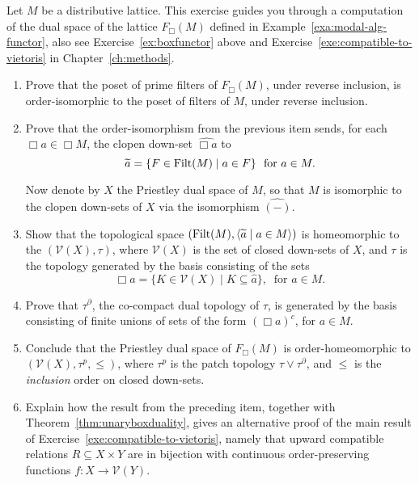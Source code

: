   
  \begin{exercise}\label{ex:upperviet-1}
  Let $M$ be a distributive lattice. This exercise guides you through a computation of the dual space of the lattice $F_{\Box}(M)$ defined in Example~\ref{exa:modal-alg-functor}, also see Exercise~\ref{ex:boxfunctor} above and Exercise~\ref{exe:compatible-to-vietoris} in Chapter~\ref{ch:methods}.
  \begin{enumerate}
  \item Prove that the poset of prime filters of $F_\Box(M)$, under reverse inclusion, is order-isomorphic to the poset of filters of $M$, under reverse inclusion.
  \item Prove that the order-isomorphism from the previous item sends, for each $\Box a \in \Box M$, the clopen down-set $\widehat{\Box a}$ to 
  \[
  \widetilde{a} = \{F\in\mathrm{Filt}(M)\mid a\in F\}\ \text{ for } a\in M.
  \]

  Now denote by $X$ the Priestley dual space of $M$, so that $M$ is isomorphic to the clopen down-sets of $X$ via the isomorphism $\widehat{(-)}$. 

  \item 
  Show that the topological space $(\mathrm{Filt}(M),\langle \widetilde{a}\mid a\in M \rangle)$ is homeomorphic to the  $(\mathcal{V}(X),\tau)$, where $\mathcal{V}(X)$ is the set of closed down-sets of $X$, and $\tau$ is the topology generated by the basis consisting of the sets
  \[
  \Box a=\{K\in\mathcal{V}(X)\mid K\subseteq \widehat{a}\},\ \text{ for } a\in M.
  \]
\item Prove that $\tau^\partial$, the co-compact dual topology of $\tau$, is generated by the basis consisting of finite unions of sets of the form $(\Box a)^c$, for $a \in M$.
\item Conclude that the Priestley dual space of $F_\Box(M)$ is order-homeomorphic to $(\mathcal{V}(X), \tau^p, \leq)$, where $\tau^p$ is the patch topology $\tau \vee \tau^\partial$, and $\leq$ is the \emph{inclusion} order on closed down-sets.
\item Explain how the result from the preceding item, together with Theorem~\ref{thm:unaryboxduality}, gives an alternative proof of the main result of Exercise~\ref{exe:compatible-to-vietoris}, namely that upward compatible relations $R \subseteq X \times Y$ are in bijection with continuous order-preserving functions $f \colon X \to \mathcal{V}(Y)$.
  \end{enumerate}
  \end{exercise}












\theendnotes
\setcounter{endnote}{0}

